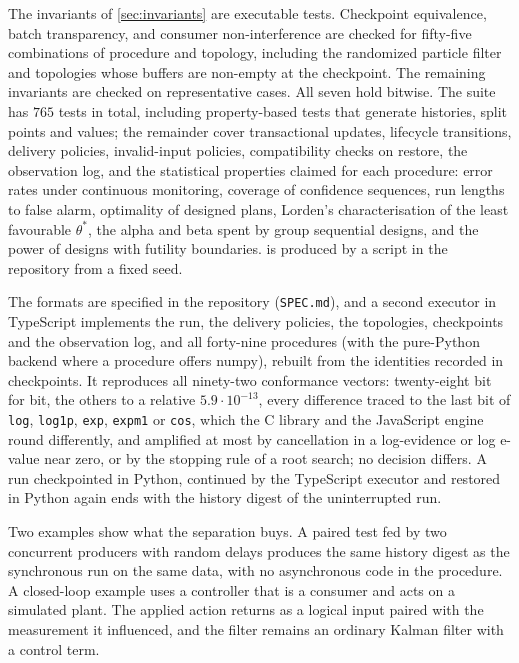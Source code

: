 \documentclass[11pt,a4paper]{article}
\theoremstyle{definition}
\theoremstyle{remark}
\newcommand{\code}[1]{\texttt{#1}}
\begin{document}
The invariants of \cref{sec:invariants} are executable tests.
Checkpoint equivalence, batch transparency, and consumer
non-interference are checked for fifty-five combinations of procedure and
topology, including the randomized particle filter and topologies whose
buffers are non-empty at the checkpoint. The remaining invariants are
checked on representative cases. All seven hold bitwise. The suite has
$765$ tests in total, including property-based tests that generate histories, split points and values; the remainder cover transactional updates,
lifecycle transitions, delivery policies, invalid-input policies,
compatibility checks on restore, the observation log, and the
statistical properties claimed for each procedure: error rates under
continuous monitoring, coverage of confidence sequences, run lengths to
false alarm, optimality of designed plans, Lorden's characterisation of
the least favourable $\theta^*$, the alpha and beta spent by group
sequential designs, and the power of designs with futility
boundaries.  is produced
by a script in the repository from a fixed seed.

The formats are specified in the repository (\code{SPEC.md}), and a
second executor in TypeScript implements the run, the delivery policies,
the topologies, checkpoints and the observation log, and all
forty-nine procedures (with the pure-Python backend where a procedure
offers numpy), rebuilt from the identities recorded in checkpoints. It
reproduces all ninety-two conformance vectors: twenty-eight bit for bit,
the others to a relative $5.9\cdot 10^{-13}$, every difference traced to
the last bit of \code{log}, \code{log1p}, \code{exp}, \code{expm1} or \code{cos},
which the C library and the JavaScript engine round differently, and
amplified at most by cancellation in a log-evidence or log e-value near zero, or by the stopping
rule of a root search; no decision differs. A run checkpointed in Python, continued by the TypeScript
executor and restored in Python again ends with the history digest of
the uninterrupted run.

Two examples show what the separation buys. A paired test fed by two
concurrent producers with random delays produces the same history
digest as the synchronous run on the same data, with no asynchronous
code in the procedure. A closed-loop example uses a controller that
is a consumer and acts on a simulated plant. The applied action returns
as a logical input paired with the measurement it influenced, and the
filter remains an ordinary Kalman filter with a control term.
\end{document}
